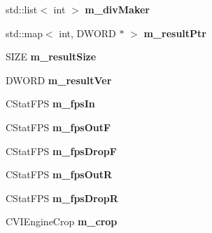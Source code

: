 \begin{DoxyCompactItemize}
\item 
\hypertarget{class_c_v_i_engine_base_a63cd16114d368eec7c2bce4c4ac8e9c8}{std\+::list$<$ int $>$ {\bfseries m\+\_\+div\+Maker}}\label{class_c_v_i_engine_base_a63cd16114d368eec7c2bce4c4ac8e9c8}

\item 
\hypertarget{class_c_v_i_engine_base_a40a1749d972d33216c2ded69498cc0b1}{std\+::map$<$ int, D\+W\+O\+R\+D $\ast$ $>$ {\bfseries m\+\_\+result\+Ptr}}\label{class_c_v_i_engine_base_a40a1749d972d33216c2ded69498cc0b1}

\item 
\hypertarget{class_c_v_i_engine_base_aec00e6d3113182f3193b3b4345c4e433}{S\+I\+Z\+E {\bfseries m\+\_\+result\+Size}}\label{class_c_v_i_engine_base_aec00e6d3113182f3193b3b4345c4e433}

\item 
\hypertarget{class_c_v_i_engine_base_a756c886b931c2c905085558d219d4045}{D\+W\+O\+R\+D {\bfseries m\+\_\+result\+Ver}}\label{class_c_v_i_engine_base_a756c886b931c2c905085558d219d4045}

\item 
\hypertarget{class_c_v_i_engine_base_a3f8d2ef96946316d4b11b4eef209cd35}{C\+Stat\+F\+P\+S {\bfseries m\+\_\+fps\+In}}\label{class_c_v_i_engine_base_a3f8d2ef96946316d4b11b4eef209cd35}

\item 
\hypertarget{class_c_v_i_engine_base_a68263a05d2dcb87863aac27632c6fefa}{C\+Stat\+F\+P\+S {\bfseries m\+\_\+fps\+Out\+F}}\label{class_c_v_i_engine_base_a68263a05d2dcb87863aac27632c6fefa}

\item 
\hypertarget{class_c_v_i_engine_base_afe15eeaa45219bf0b4c4ffbf08887d4a}{C\+Stat\+F\+P\+S {\bfseries m\+\_\+fps\+Drop\+F}}\label{class_c_v_i_engine_base_afe15eeaa45219bf0b4c4ffbf08887d4a}

\item 
\hypertarget{class_c_v_i_engine_base_a2ad39d8c6557ef3c0dd6fb9dc376c8b5}{C\+Stat\+F\+P\+S {\bfseries m\+\_\+fps\+Out\+R}}\label{class_c_v_i_engine_base_a2ad39d8c6557ef3c0dd6fb9dc376c8b5}

\item 
\hypertarget{class_c_v_i_engine_base_a3bd5b977e29332c55f1eaf9a1192d03a}{C\+Stat\+F\+P\+S {\bfseries m\+\_\+fps\+Drop\+R}}\label{class_c_v_i_engine_base_a3bd5b977e29332c55f1eaf9a1192d03a}

\item 
\hypertarget{class_c_v_i_engine_base_a914dcdad5bb4fa5d7c0363122aa5fa0b}{C\+V\+I\+Engine\+Crop {\bfseries m\+\_\+crop}}\label{class_c_v_i_engine_base_a914dcdad5bb4fa5d7c0363122aa5fa0b}


\end{DoxyCompactItemize}
